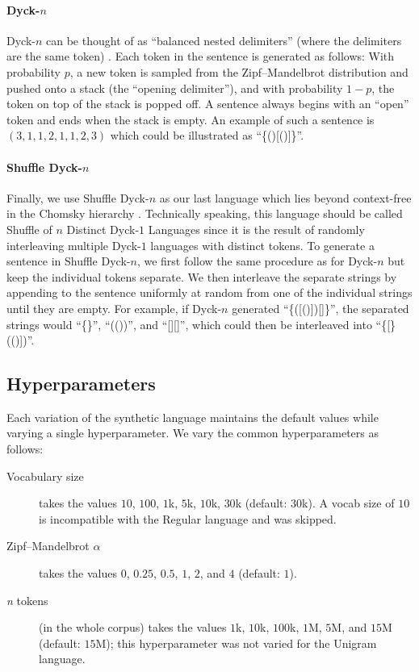 \paragraph{Dyck-$\textit{n}$}
Dyck-$n$ can be thought of as ``balanced nested delimiters'' (where the delimiters are the same token) \citep{schutzenberger1963}.
Each token in the sentence is generated as follows:
  With probability $p$, a new token is sampled from the Zipf--Mandelbrot distribution and pushed onto a stack (the ``opening delimiter''), and with probability $1-p$, the token on top of the stack is popped off.
A sentence always begins with an ``open'' token and ends when the stack is empty.
An example of such a sentence is $(3, 1, 1, 2, 1, 1, 2, 3)$ which could be illustrated as ``\{()[()]\}''.


\paragraph{Shuffle Dyck-$\textit{n}$}
Finally, we use Shuffle Dyck-$n$ as our last language which lies beyond context-free in the Chomsky hierarchy \citet{suzgun-etal-2019-lstm}.
Technically speaking, this language should be called Shuffle of $n$ Distinct Dyck-$1$ Languages since it is the result of randomly interleaving multiple Dyck-$1$ languages with distinct tokens.
To generate a sentence in Shuffle Dyck-$n$, we first follow the same procedure as for Dyck-$n$ but keep the individual tokens separate.
We then interleave the separate strings by appending to the sentence uniformly at random from one of the individual strings until they are empty.
For example, if Dyck-$n$ generated ``\{([()])[]\}'', the separated strings would ``\{\}'', ``(())'', and ``[][]'', which could then be interleaved into ``\{[\}(()])''.


\subsection{Hyperparameters}

Each variation of the synthetic language maintains the default values while varying a single hyperparameter.
We vary the common hyperparameters as follows:
\begin{description}
  \item[Vocabulary size]
    takes the values $10$, $100$, $1$k, $5$k, $10$k, $30$k (default: $30$k).  A vocab size of $10$ is incompatible with the Regular language and was skipped.
  \item[Zipf--Mandelbrot $\alpha$]
    takes the values $0$, $0.25$, $0.5$, $1$, $2$, and $4$ (default: $1$).
  \item[\textit{n} tokens]
    (in the whole corpus) takes the values $1$k, $10$k, $100$k, $1$M, $5$M, and $15$M (default: $15$M); this hyperparameter was not varied for the Unigram language.
\end{description}

